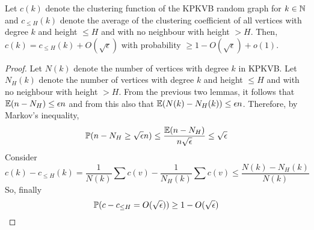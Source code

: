 \begin{lemma}
Let $c(k)$ denote the clustering function of the KPKVB random graph for $k \in \mathbb{N}$ and $c_{\leq H}(k)$ denote the average of the clustering coefficient of all vertices with degree $k$ and height $\leq H$ and with no neighbour with height $>H$. Then,
$c(k) = c_{\leq H}(k) + O(\sqrt{\epsilon})$ with probability $\geq 1-O(\sqrt{\epsilon})+o(1)$.
\end{lemma}
\begin{proof}
Let $N(k)$ denote the number of vertices with degree $k$ in KPKVB.
Let $N_H(k)$ denote the number of vertices with degree $k$ and height $\leq H$ and with no neighbour with height $>H$. From the previous two lemmas, it follows that $\mathbb{E} (n- N_H) \leq \epsilon n$ and from this also that $\mathbb{E} (N(k)-N_H(k))\leq \epsilon n$. Therefore, by Markov's inequality, 
$$\mathbb{P}( n-N_H \geq \sqrt{\epsilon}n) \leq \frac{\mathbb{E} (n-N_H)}{n \sqrt{\epsilon}} \leq \sqrt{\epsilon}$$
Consider 
$$c(k)-c_{\leq H}(k) = \frac{1}{N(k)}\sum c(v) - \frac{1}{N_H(k)}\sum c(v) \leq \frac{N(k)-N_H(k)}{N(k)}$$
So, finally
$$\mathbb{P}( c-c_{\leq H} = O(\sqrt{\epsilon}) ) \geq 1-O(\sqrt{\epsilon})$$
\end{proof}

